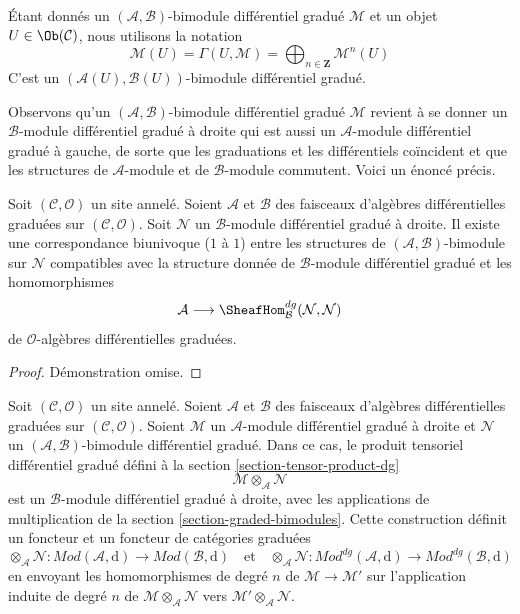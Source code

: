 \noindent
Étant donnés un $(\mathcal{A}, \mathcal{B})$-bimodule différentiel gradué $\mathcal{M}$
et un objet $U \in \Ob(\mathcal{C})$, nous utilisons la
notation $$
\mathcal{M}(U)
= \Gamma(U, \mathcal{M})
= \bigoplus\nolimits_{n \in \mathbf{Z}} \mathcal{M}^n(U)
$$
C'est un $(\mathcal{A}(U), \mathcal{B}(U))$-bimodule différentiel gradué.

\medskip\noindent
Observons qu'un $(\mathcal{A}, \mathcal{B})$-bimodule différentiel gradué
$\mathcal{M}$ revient à se donner un
$\mathcal{B}$-module différentiel gradué à droite qui est aussi un
$\mathcal{A}$-module différentiel gradué à gauche, de sorte que les graduations et les
différentiels coïncident et que les structures de $\mathcal{A}$-module
et de $\mathcal{B}$-module commutent. Voici un énoncé précis.

\begin{lemma}
\label{lemma-what-makes-a-bimodule-dg} Soit
$(\mathcal{C}, \mathcal{O})$ un site annelé. Soient $\mathcal{A}$ et
$\mathcal{B}$ des faisceaux d'algèbres différentielles graduées sur
$(\mathcal{C}, \mathcal{O})$. Soit $\mathcal{N}$ un
$\mathcal{B}$-module différentiel gradué à droite. Il existe une correspondance biunivoque ($1$ à $1$) entre les
structures de $(\mathcal{A}, \mathcal{B})$-bimodule sur
$\mathcal{N}$ compatibles avec la structure
donnée de $\mathcal{B}$-module différentiel gradué et les homomorphismes
$$
\mathcal{A}
\longrightarrow
\SheafHom^{dg}_\mathcal{B}(\mathcal{N}, \mathcal{N})
$$ de
$\mathcal{O}$-algèbres différentielles graduées.
\end{lemma}

\begin{proof}
Démonstration
omise. \end{proof}

\noindent
Soit $(\mathcal{C}, \mathcal{O})$ un site annelé. Soient $\mathcal{A}$ et
$\mathcal{B}$ des faisceaux d'algèbres différentielles graduées sur
$(\mathcal{C}, \mathcal{O})$. Soient $\mathcal{M}$ un
$\mathcal{A}$-module différentiel gradué à droite et $\mathcal{N}$ un
$(\mathcal{A}, \mathcal{B})$-bimodule différentiel gradué. Dans ce cas, le produit
tensoriel différentiel gradué défini à la section
\ref{section-tensor-product-dg}
$$
\mathcal{M} \otimes_\mathcal{A} \mathcal{N}
$$ est un
$\mathcal{B}$-module différentiel gradué à droite, avec les
applications de multiplication de la section \ref{section-graded-bimodules}.
Cette construction définit un foncteur et un foncteur de catégories
graduées $$
\otimes_\mathcal{A} \mathcal{N}
: \textit{Mod}(\mathcal{A}, \text{d})
\longrightarrow
\textit{Mod}(\mathcal{B}, \text{d})
\quad\text{et}\quad
\otimes_\mathcal{A} \mathcal{N}
: \textit{Mod}^{dg}(\mathcal{A}, \text{d})
\longrightarrow
\textit{Mod}^{dg}(\mathcal{B}, \text{d})
$$
en envoyant les homomorphismes de degré $n$ de $\mathcal{M} \to \mathcal{M}'$
sur l'application induite de degré $n$
de $\mathcal{M} \otimes_\mathcal{A} \mathcal{N}$ vers
$\mathcal{M}' \otimes_\mathcal{A} \mathcal{N}$.


